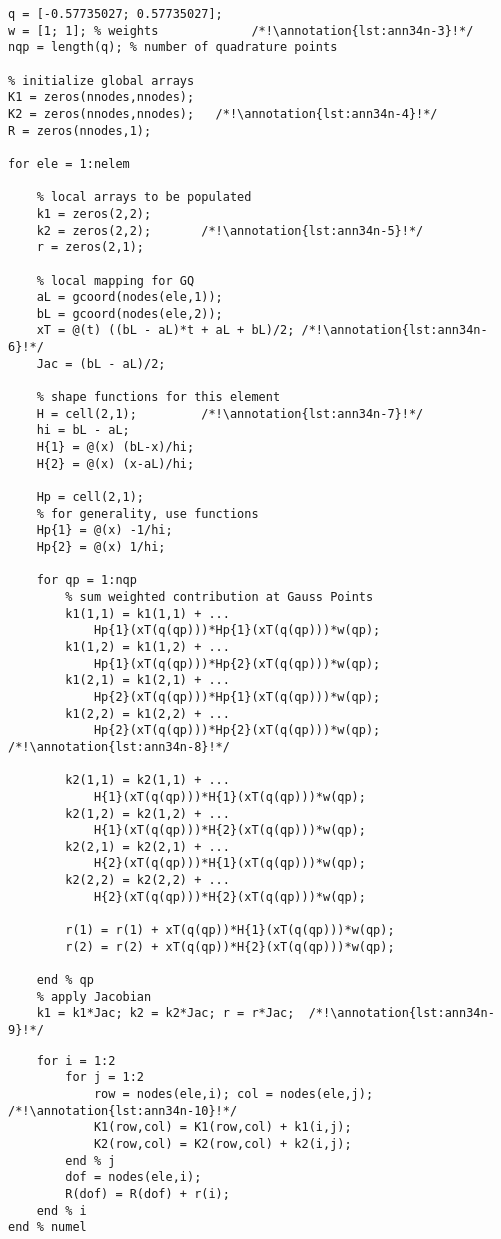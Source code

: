 \begin{lstlisting}[style=myMatlab,name=lec34n-ex1]
% sample points for Gauss Quadrature
q = [-0.57735027; 0.57735027];
w = [1; 1]; % weights             /*!\annotation{lst:ann34n-3}!*/
nqp = length(q); % number of quadrature points

% initialize global arrays
K1 = zeros(nnodes,nnodes);
K2 = zeros(nnodes,nnodes);   /*!\annotation{lst:ann34n-4}!*/
R = zeros(nnodes,1);

for ele = 1:nelem
    
    % local arrays to be populated
    k1 = zeros(2,2);
    k2 = zeros(2,2);       /*!\annotation{lst:ann34n-5}!*/
    r = zeros(2,1);
    
    % local mapping for GQ
    aL = gcoord(nodes(ele,1));
    bL = gcoord(nodes(ele,2));
    xT = @(t) ((bL - aL)*t + aL + bL)/2; /*!\annotation{lst:ann34n-6}!*/
    Jac = (bL - aL)/2;

    % shape functions for this element
    H = cell(2,1);         /*!\annotation{lst:ann34n-7}!*/
    hi = bL - aL;
    H{1} = @(x) (bL-x)/hi;
    H{2} = @(x) (x-aL)/hi;

    Hp = cell(2,1);
    % for generality, use functions
    Hp{1} = @(x) -1/hi;
    Hp{2} = @(x) 1/hi;

    for qp = 1:nqp        
        % sum weighted contribution at Gauss Points
        k1(1,1) = k1(1,1) + ...
            Hp{1}(xT(q(qp)))*Hp{1}(xT(q(qp)))*w(qp);
        k1(1,2) = k1(1,2) + ...
            Hp{1}(xT(q(qp)))*Hp{2}(xT(q(qp)))*w(qp);
        k1(2,1) = k1(2,1) + ...
            Hp{2}(xT(q(qp)))*Hp{1}(xT(q(qp)))*w(qp);
        k1(2,2) = k1(2,2) + ...
            Hp{2}(xT(q(qp)))*Hp{2}(xT(q(qp)))*w(qp); /*!\annotation{lst:ann34n-8}!*/
        
        k2(1,1) = k2(1,1) + ...
            H{1}(xT(q(qp)))*H{1}(xT(q(qp)))*w(qp);
        k2(1,2) = k2(1,2) + ...
            H{1}(xT(q(qp)))*H{2}(xT(q(qp)))*w(qp);
        k2(2,1) = k2(2,1) + ...
            H{2}(xT(q(qp)))*H{1}(xT(q(qp)))*w(qp);
        k2(2,2) = k2(2,2) + ...
            H{2}(xT(q(qp)))*H{2}(xT(q(qp)))*w(qp);
        
        r(1) = r(1) + xT(q(qp))*H{1}(xT(q(qp)))*w(qp);
        r(2) = r(2) + xT(q(qp))*H{2}(xT(q(qp)))*w(qp);        

    end % qp
    % apply Jacobian
    k1 = k1*Jac; k2 = k2*Jac; r = r*Jac;  /*!\annotation{lst:ann34n-9}!*/
\end{lstlisting}
\begin{lstlisting}[style=myMatlab,name=lec34n-ex1]
    % add local arrays to global arrays ("assembly")
    for i = 1:2
        for j = 1:2
            row = nodes(ele,i); col = nodes(ele,j); /*!\annotation{lst:ann34n-10}!*/
            K1(row,col) = K1(row,col) + k1(i,j);
            K2(row,col) = K2(row,col) + k2(i,j);
        end % j
        dof = nodes(ele,i);
        R(dof) = R(dof) + r(i);
    end % i
end % numel
\end{lstlisting}

